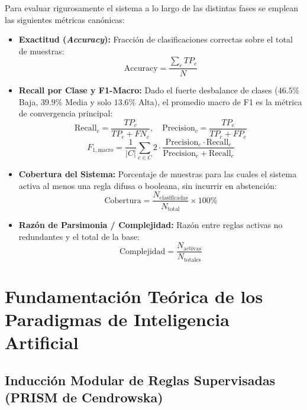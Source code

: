 \documentclass{article}
\begin{document}
Para evaluar rigurosamente el sistema a lo largo de las distintas fases se emplean las siguientes métricas canónicas:
\begin{itemize}
    \item \textbf{Exactitud (\textit{Accuracy}):} Fracción de clasificaciones correctas sobre el total de muestras:
    \begin{equation}
        \text{Accuracy} = \frac{\sum_{c} TP_c}{N}
    \end{equation}
    \item \textbf{Recall por Clase y F1-Macro:} Dado el fuerte desbalance de clases ($46.5\%$ Baja, $39.9\%$ Media y solo $13.6\%$ Alta), el promedio macro de F1 es la métrica de convergencia principal:
    \begin{equation}
        \text{Recall}_c = \frac{TP_c}{TP_c + FN_c}, \quad \text{Precision}_c = \frac{TP_c}{TP_c + FP_c}
    \end{equation}
    \begin{equation}
        F_{1,\text{macro}} = \frac{1}{|C|} \sum_{c \in C} 2 \cdot \frac{\text{Precision}_c \cdot \text{Recall}_c}{\text{Precision}_c + \text{Recall}_c}
    \end{equation}
    \item \textbf{Cobertura del Sistema:} Porcentaje de muestras para las cuales el sistema activa al menos una regla difusa o booleana, sin incurrir en abstención:
    \begin{equation}
        \text{Cobertura} = \frac{N_{\text{clasificadas}}}{N_{\text{total}}} \times 100\%
    \end{equation}
    \item \textbf{Razón de Parsimonia / Complejidad:} Razón entre reglas activas no redundantes y el total de la base:
    \begin{equation}
        \text{Complejidad} = \frac{N_{\text{activas}}}{N_{\text{totales}}}
    \end{equation}
\end{itemize}


\section{Fundamentación Teórica de los Paradigmas de Inteligencia Artificial}

\subsection{Inducción Modular de Reglas Supervisadas (PRISM de Cendrowska)}
\end{document}
